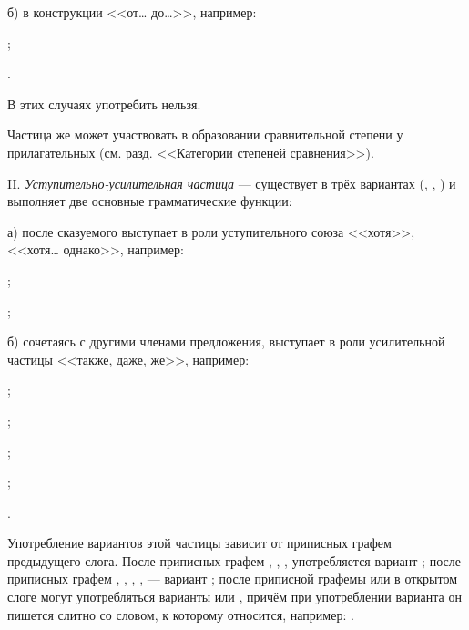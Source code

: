 б) в конструкции <<от\ldots{} до\ldots{}>>, например:
\begin{prfsample}
	\item {};
	\item {}.
\end{prfsample}
В этих случаях  употребить нельзя.

Частица же  может участвовать в образовании сравнительной степени у прилагательных (см. разд. <<Категории степеней сравнения>>).

II. \emph{Уступительно-усилительная частица} --- существует в трёх вариантах (, , ) и выполняет две основные грамматические функции:

а) после сказуемого выступает в роли уступительного союза <<хотя>>, <<хотя\ldots{} однако>>, например:
\begin{prfsample}
	\item {};
	\item {};
\end{prfsample}

б) сочетаясь с другими членами предложения, выступает в роли усилительной частицы <<также, даже, же>>, например:
\begin{prfsample}
	\item {};
	\item {};
	\item {};
	\item {};
	\item {}.
\end{prfsample}

Употребление вариантов этой частицы зависит от приписных графем предыдущего слога. После приписных графем , , ,  употребляется вариант ; после приписных графем , , , ,  --- вариант ; после приписной графемы	 или в открытом слоге могут употребляться варианты  или , причём при употреблении варианта он пишется слитно со словом, к которому относится, например: .

